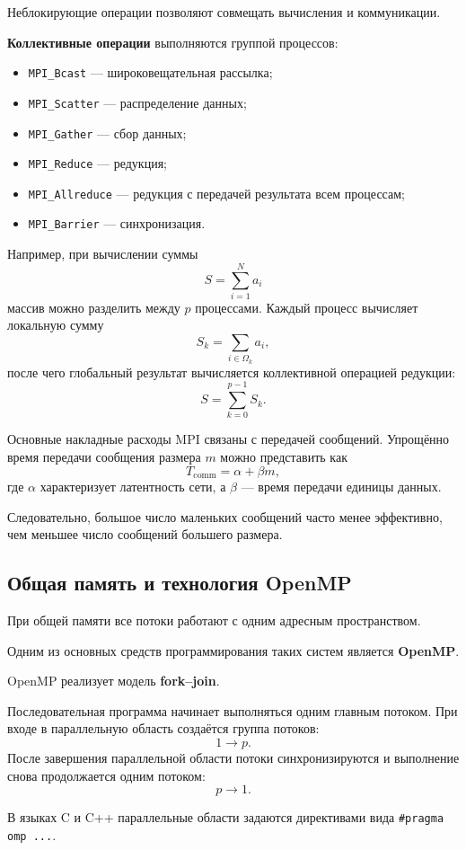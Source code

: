 Неблокирующие операции позволяют совмещать вычисления и коммуникации.

\textbf{Коллективные операции} выполняются группой процессов:
\begin{itemize}
	\item \texttt{MPI\_Bcast} --- широковещательная рассылка;
	\item \texttt{MPI\_Scatter} --- распределение данных;
	\item \texttt{MPI\_Gather} --- сбор данных;
	\item \texttt{MPI\_Reduce} --- редукция;
	\item \texttt{MPI\_Allreduce} --- редукция с передачей результата всем процессам;
	\item \texttt{MPI\_Barrier} --- синхронизация.
\end{itemize}

Например, при вычислении суммы
\[
S = \sum_{i=1}^{N} a_i
\]
массив можно разделить между $p$ процессами. Каждый процесс вычисляет локальную
сумму
\[
S_k = \sum_{i\in\Omega_k} a_i,
\]
после чего глобальный результат вычисляется коллективной операцией редукции:
\[
S = \sum_{k=0}^{p-1} S_k.
\]

Основные накладные расходы MPI связаны с передачей сообщений.
Упрощённо время передачи сообщения размера $m$ можно представить как
\[
T_{\mathrm{comm}} = \alpha + \beta m,
\]
где $\alpha$ характеризует латентность сети,
а $\beta$ --- время передачи единицы данных.

Следовательно, большое число маленьких сообщений часто менее эффективно,
чем меньшее число сообщений большего размера.

\subsection{Общая память и технология OpenMP}

При общей памяти все потоки работают с одним адресным пространством.

Одним из основных средств программирования таких систем является
\textbf{OpenMP}.

OpenMP реализует модель \textbf{fork--join}.

Последовательная программа начинает выполняться одним главным потоком.
При входе в параллельную область создаётся группа потоков:
\[
1 \longrightarrow p.
\]
После завершения параллельной области потоки синхронизируются и выполнение
снова продолжается одним потоком:
\[
p \longrightarrow 1.
\]

В языках C и C++ параллельные области задаются директивами вида
\texttt{\#pragma omp ...}.

